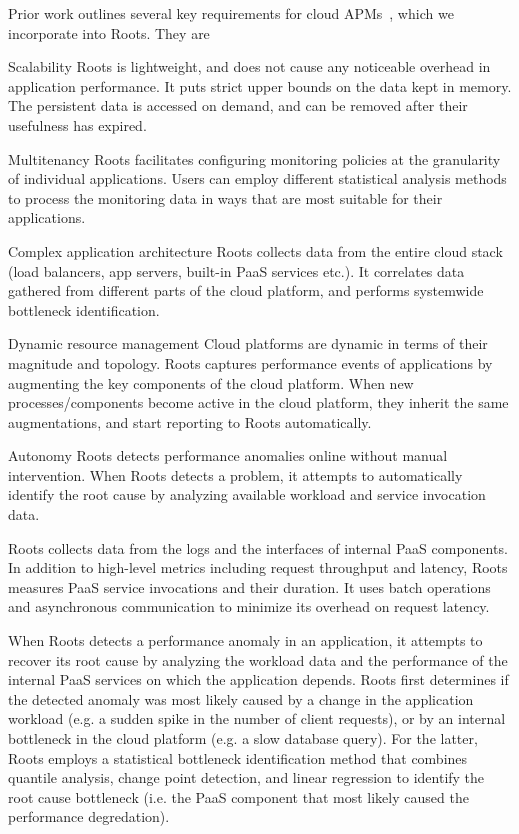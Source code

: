 Prior work outlines several key requirements for cloud APMs~\cite{DaCunhaRodrigues:2016:MCC:2851613.2851619,Ibidunmoye:2015:PAD:2808687.2791120},
which we incorporate into Roots.  They are
\begin{LaTeXdescription}
\item[Scalability] Roots is lightweight, and does not cause any noticeable overhead in 
application performance. It puts strict upper bounds on the data kept in memory. 
The persistent data is accessed on demand, and can be removed after their usefulness has expired.
\item[Multitenancy] Roots facilitates configuring monitoring policies at the granularity of individual applications.
Users can employ different statistical analysis methods to process the monitoring data in ways that are 
most suitable for their applications.
\item[Complex application architecture] Roots collects data from the entire cloud stack 
(load balancers, app servers, built-in PaaS services etc.). It correlates data gathered
from different parts of the cloud platform, and performs systemwide bottleneck identification.
\item[Dynamic resource management] Cloud platforms are dynamic in terms of their magnitude 
and topology. Roots captures performance events of applications by augmenting 
the key components of the cloud platform. When new processes/components become active
in the cloud platform, they inherit the same augmentations, and start reporting to Roots automatically.
\item[Autonomy] Roots detects performance anomalies online without manual intervention.
When Roots detects a problem, it attempts to automatically identify the root cause by analyzing
available workload and service invocation data.
\vspace{-0.05in}
\end{LaTeXdescription}

Roots collects data from the logs and the interfaces of internal PaaS components.
In addition to high-level metrics including request throughput
and latency, 
Roots measures PaaS service invocations and their duration.
It uses batch operations and asynchronous 
communication to minimize its overhead on request latency.

When Roots detects a performance anomaly in an application, 
it attempts to recover its 
root cause by analyzing the workload data
and the performance of the internal PaaS services on which the 
application depends.
Roots first determines if the detected anomaly was most likely caused by a change in the
application workload (e.g. a sudden spike in the number of client requests), or by an internal
bottleneck in the cloud platform (e.g. a slow database query). 
For the latter,
Roots employs a statistical bottleneck identification method 
that  combines quantile analysis, change point detection,
and linear regression to identify the root cause bottleneck 
(i.e. the PaaS component that most likely caused the performance degredation).

